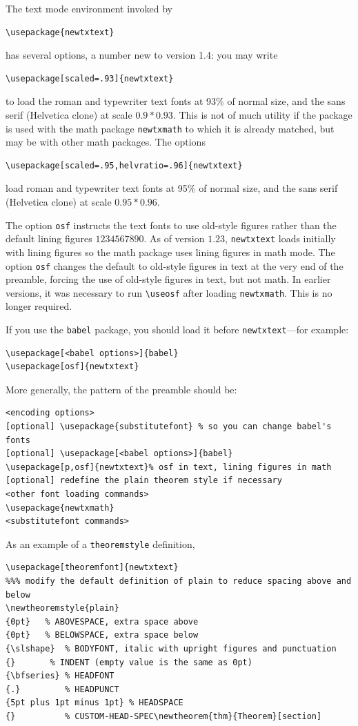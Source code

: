 \documentclass[11pt]{article}
\theoremstyle{oldplain}
\theoremstyle{plain}
\begin{document}
The text mode environment invoked by
\begin{verbatim}
\usepackage{newtxtext}
\end{verbatim}
has several options, a number new to version 1.4: you may write
\begin{verbatim}
\usepackage[scaled=.93]{newtxtext}
\end{verbatim}
to load the roman and typewriter text fonts at 93\% of normal size, and the sans serif (\textsf{Helvetica} clone) at scale $0.9*0.93$. This is not of much utility if the package is used with the math package {\tt newtxmath} to which it is already matched, but may be with other math packages. The options
\begin{verbatim}
\usepackage[scaled=.95,helvratio=.96]{newtxtext}
\end{verbatim}
load roman and typewriter text fonts at 95\% of normal size, and the sans serif (\textsf{Helvetica} clone) at scale $0.95*0.96$.

The option \texttt{osf} instructs the text fonts to use old-style figures  rather than the default lining figures $1234567890$. As of version $1.23$, {\tt newtxtext} loads initially with lining figures so the math package uses lining figures in math mode. The option {\tt osf} changes the default to old-style figures in text at the very end of the preamble, forcing the use of old-style figures in text, but not math. In earlier versions, it was necessary to run 
\verb|\useosf| after loading {\tt newtxmath}. This is no longer required. 

If you use the {\tt babel} package, you should load it before {\tt newtxtext}---for example:
\begin{verbatim}
\usepackage[<babel options>]{babel}
\usepackage[osf]{newtxtext}
\end{verbatim}
More generally, the pattern of the preamble should be:
\begin{verbatim}
<encoding options>
[optional] \usepackage{substitutefont} % so you can change babel's fonts
[optional] \usepackage[<babel options>]{babel}
\usepackage[p,osf]{newtxtext}% osf in text, lining figures in math
[optional] redefine the plain theorem style if necessary
<other font loading commands>
\usepackage{newtxmath}
<substitutefont commands>
\end{verbatim}
As an example of a {\tt theoremstyle} definition,
\begin{verbatim}
\usepackage[theoremfont]{newtxtext}
%%% modify the default definition of plain to reduce spacing above and below
\newtheoremstyle{plain}
{0pt}   % ABOVESPACE, extra space above
{0pt}   % BELOWSPACE, extra space below
{\slshape}  % BODYFONT, italic with upright figures and punctuation
{}       % INDENT (empty value is the same as 0pt)
{\bfseries} % HEADFONT
{.}         % HEADPUNCT
{5pt plus 1pt minus 1pt} % HEADSPACE
{}          % CUSTOM-HEAD-SPEC\newtheorem{thm}{Theorem}[section]
\end{verbatim}
\end{document}
